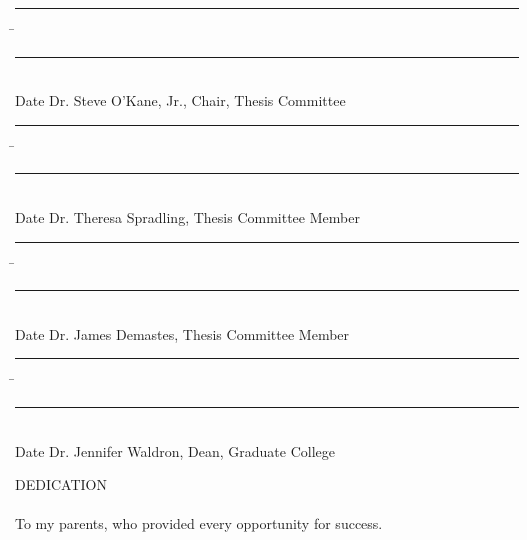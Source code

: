 \begin{noindent}
\begin{tabbing}
\rule{1.25in}{0.4pt}\hspace{0.75in}\=\rule{4in}{0.4pt}\\
Date \> Dr. Steve O'Kane, Jr., Chair, Thesis Committee\\
\end{tabbing}

\begin{tabbing}
\rule{1.25in}{0.4pt}\hspace{0.75in}\=\rule{4in}{0.4pt}\\
Date \> Dr. Theresa Spradling, Thesis Committee Member\\
\end{tabbing}

\begin{tabbing}
\rule{1.25in}{0.4pt}\hspace{0.75in}\=\rule{4in}{0.4pt}\\
Date \> Dr. James Demastes, Thesis Committee Member\\
\end{tabbing}

\begin{tabbing}
\rule{1.25in}{0.4pt}\hspace{0.75in}\=\rule{4in}{0.4pt}\\
Date \> Dr. Jennifer Waldron, Dean, Graduate College\\
\end{tabbing}
\end{noindent}

\doublespacing

\clearpage
\thispagestyle{empty}
\begin{center}
DEDICATION
\end{center}

\paragraph{} To my parents, who provided every opportunity for success.

\clearpage
\renewcommand{\contentsname}{TABLE OF CONTENTS} %
\setcounter{tocdepth}{3}
\tableofcontents
{}

\clearpage
{} \label{listoftab}
\renewcommand{\listtablename}{LIST OF TABLES} %
\listoftables
{}

\clearpage
{} \label{listoffig}
\renewcommand{\listfigurename}{LIST OF FIGURES} %
\listoffigures
{}

